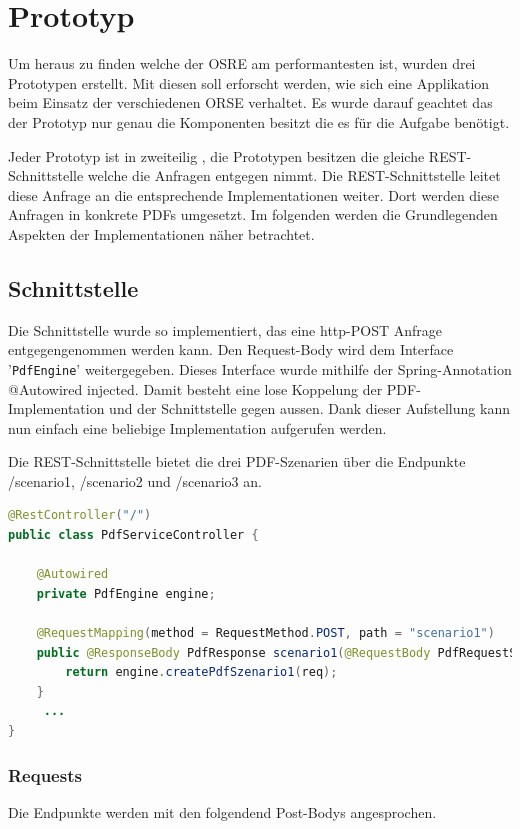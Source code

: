 \documentclass[main.tex]{subfiles}
\begin{document}
\chapter{Prototyp}
Um heraus zu finden welche der OSRE am performantesten ist, wurden drei Prototypen erstellt. Mit diesen soll erforscht werden, wie sich eine Applikation beim Einsatz der verschiedenen ORSE verhaltet. Es wurde darauf geachtet das der Prototyp nur genau die Komponenten besitzt die es für die Aufgabe benötigt.  

Jeder Prototyp ist in zweiteilig , die Prototypen besitzen die gleiche REST-Schnittstelle welche die Anfragen entgegen nimmt. Die REST-Schnittstelle leitet diese Anfrage  an die entsprechende Implementationen weiter. Dort werden diese Anfragen in konkrete PDFs umgesetzt. Im folgenden werden die Grundlegenden Aspekten der Implementationen näher betrachtet. 


\section{Schnittstelle}


Die Schnittstelle wurde so implementiert, das eine \acrshort{http}-POST Anfrage entgegengenommen werden kann. Den Request-Body wird dem Interface '\texttt{PdfEngine}' weitergegeben. Dieses Interface wurde mithilfe der Spring-Annotation @Autowired injected. Damit besteht eine lose Koppelung der PDF-Implementation und der Schnittstelle gegen aussen. Dank dieser Aufstellung kann nun einfach eine beliebige Implementation aufgerufen werden.

Die REST-Schnittstelle bietet die drei PDF-Szenarien über die Endpunkte /scenario1, /scenario2 und /scenario3 an.   

\begin{lstlisting}[language=Java]
@RestController("/")
public class PdfServiceController {

	@Autowired
	private PdfEngine engine;

	@RequestMapping(method = RequestMethod.POST, path = "scenario1")
	public @ResponseBody PdfResponse scenario1(@RequestBody PdfRequestScenario1 req) {
		return engine.createPdfSzenario1(req);
	}
     ...
}
\end{lstlisting}

\subsection{Requests}
Die Endpunkte werden mit den folgendend Post-Bodys angesprochen. 
\end{document}
